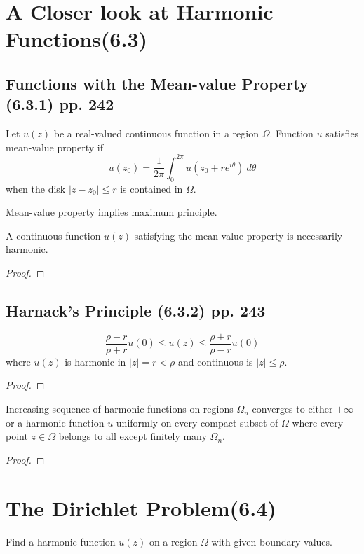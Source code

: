 \section{A Closer look at Harmonic Functions(6.3)}
\subsection{Functions with the Mean-value Property (6.3.1) pp. 242}
\begin{definition}
	Let $u(z)$ be a real-valued continuous function in a region $\Omega$. Function $u$ satisfies mean-value property if
	\[ u(z_0) = \frac{1}{2\pi} \int_0^{2\pi} u(z_0+re^{i\theta})\ d\theta \]
	when the disk $|z-z_0| \le r$ is contained in $\Omega$.
\end{definition}
\begin{remark}
	Mean-value property implies maximum principle.
\end{remark}
\begin{theorem}
	A continuous function $u(z)$ satisfying the mean-value property is necessarily harmonic.
\end{theorem}
\begin{proof}
\end{proof}

\subsection{Harnack's Principle (6.3.2) pp. 243}
\begin{theorem}
	\[ \frac{\rho-r}{\rho+r} u(0) \le u(z) \le \frac{\rho+r}{\rho-r}u(0) \]
	where $u(z)$ is harmonic in $|z| = r < \rho$ and continuous is $|z| \le \rho$.
\end{theorem}
\begin{proof}
\end{proof}

\begin{theorem}
	Increasing sequence of harmonic functions on regions $\Omega_n$ converges to either $+\infty$ or a harmonic function $u$ uniformly on every compact subset of $\Omega$ where every point $z \in \Omega$ belongs to all except finitely many $\Omega_n$.
\end{theorem}
\begin{proof}
\end{proof}

\section{The Dirichlet Problem(6.4)}
\begin{definition}
	Find a harmonic function $u(z)$ on a region $\Omega$ with given boundary values.
\end{definition}

